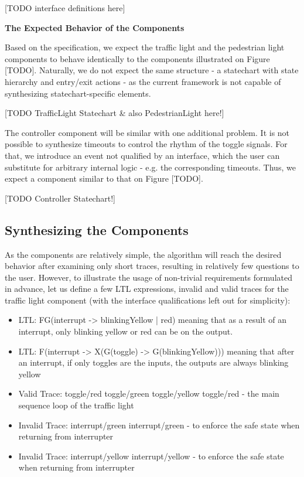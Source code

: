 [TODO interface definitions here]

\textbf{The Expected Behavior of the Components} 

Based on the specification, we expect the traffic light and the pedestrian light components to behave identically to the components illustrated on Figure [TODO]. Naturally, we do not expect the same structure - a statechart with state hierarchy and entry/exit actions - as the current framework is not capable of synthesizing statechart-specific elements. 

[TODO TrafficLight Statechart \& also PedestrianLight here!]

The controller component will be similar with one additional problem. It is not possible to synthesize timeouts to control the rhythm of the toggle signals. For that, we introduce an event not qualified by an interface, which the user can substitute for arbitrary internal logic - e.g. the corresponding timeouts. Thus, we expect a component similar to that on Figure [TODO].

[TODO Controller Statechart!]


\subsection{Synthesizing the Components} \label{subs_casestudysynth}

As the components are relatively simple, the algorithm will reach the desired behavior after examining only short traces, resulting in relatively few questions to the user. However, to illustrate the usage of non-trivial requirements formulated in advance, let us define a few LTL expressions, invalid and valid traces for the traffic light component (with the interface qualifications left out for simplicity):

\begin{itemize}
	\item LTL: FG(interrupt -> blinkingYellow | red) meaning that as a result of an interrupt, only blinking yellow or red can be on the output. 
	\item LTL: F(interrupt -> X(G(toggle) -> G(blinkingYellow))) meaning that after an interrupt, if only toggles are the inputs, the outputs are always blinking yellow
	\item Valid Trace: toggle/red toggle/green toggle/yellow toggle/red - the main sequence loop of the traffic light
	\item Invalid Trace: interrupt/green interrupt/green - to enforce the safe state when returning from interrupter
	\item Invalid Trace: interrupt/yellow interrupt/yellow - to enforce the safe state when returning from interrupter 
\end{itemize}

